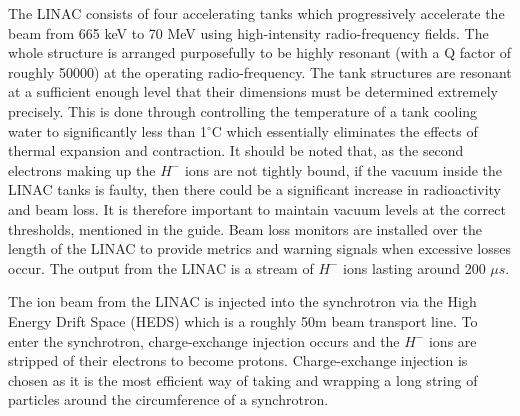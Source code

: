 \documentclass[10pt,oneside]{report}
\begin{document}
The LINAC consists of four accelerating tanks which progressively accelerate the beam from 665 keV to 70 MeV using high-intensity radio-frequency fields. The whole structure is arranged purposefully to be highly resonant (with a Q factor \cite{michael2006electronic} of roughly 50000) at the operating radio-frequency. The tank structures are resonant at a sufficient enough level that their dimensions must be determined extremely precisely. This is done through controlling the temperature of a tank cooling water to significantly less than 1$^\circ $C which essentially eliminates the effects of thermal expansion and contraction. It should be noted that, as the second electrons making up the $H^-$ ions are not tightly bound, if the vacuum inside the LINAC tanks is faulty, then there could be a significant increase in radioactivity and beam loss. It is therefore important to maintain vacuum levels at the correct thresholds, mentioned in the guide. Beam loss monitors are installed over the length of the LINAC to provide metrics and warning signals when excessive losses occur. The output from the LINAC is a stream of $H^-$ ions lasting around 200 $\mu s$. 

The ion beam from the LINAC is injected into the synchrotron via the High Energy Drift Space (HEDS) which is a roughly 50m beam transport line. To enter the synchrotron, charge-exchange injection \cite{ankenbrandt1980h} occurs and the $H^-$ ions are stripped of their electrons to become protons. Charge-exchange injection is chosen as it is the most efficient way of taking and wrapping a long string of particles around the circumference of a synchrotron.
\end{document}

